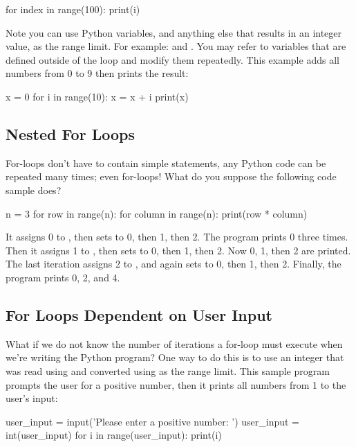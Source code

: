 \documentclass[11pt]{cselabheader}
\begin{document}
\begin{python3code}
for index in range(100):
    print(i)
\end{python3code}

Note you can use Python variables, and anything else that results in an
integer value, as the range limit. For example:
 and .
You may refer to variables that are defined outside of the  loop
and modify them repeatedly. This example adds all numbers from 0 to 9
then prints the result:

\begin{python3code}
x = 0
for i in range(10):
    x = x + i
print(x)
\end{python3code}

\subsection{Nested For Loops}

For-loops don't have to contain simple statements, any Python code can be
repeated many times; even for-loops!
What do you suppose the following code sample does?

\begin{python3code}
n = 3
for row in range(n):
    for column in range(n):
        print(row * column)
\end{python3code}

It assigns 0 to ,
then sets  to 0, then 1, then 2.
The program prints 0 three times.
Then it assigns 1 to ,
then sets  to 0, then 1, then 2.
Now 0, 1, then 2 are printed.
The last iteration assigns 2 to ,
and again sets  to 0, then 1, then 2.
Finally, the program prints 0, 2, and 4.

\subsection{For Loops Dependent on User Input}
What if we do not know the number of iterations a for-loop must
execute when we're writing the Python program?  One way to do this is
to use an integer that was read using
 and converted using
 as the range limit.
This sample program prompts the user for a positive number, then it
prints all numbers from 1 to the user's input:

\begin{python3code}
user_input = input('Please enter a positive number: ')
user_input = int(user_input)
for i in range(user_input):
    print(i)
\end{python3code}
\end{document}
